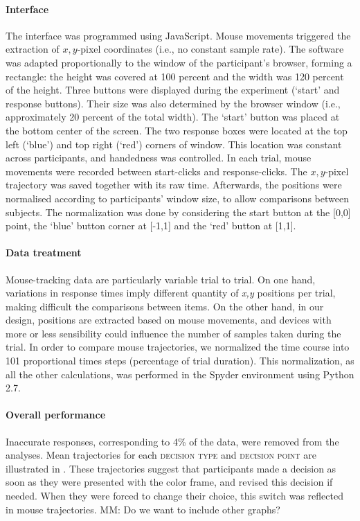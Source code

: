 \documentclass{article}
\newcommand{\addMM}[1]{{\leavevmode\color{red}#1}}
\begin{document}
\paragraph{Interface}
The interface was programmed using JavaScript. Mouse movements triggered the extraction of $x,y$-pixel coordinates (i.e., no constant sample rate). The software was adapted proportionally to the window of the participant's browser, forming a rectangle: the height was covered at 100 percent and the width was 120 percent of the height. 
Three buttons were displayed during the experiment (`start' and response buttons). Their size was also determined by the browser window (i.e., approximately 20 percent of the total width). The `start' button was placed at the bottom center of the screen. The two response boxes were located at the top left (`blue') and top right (`red') corners of window. This location was constant across participants, and handedness was controlled.  
In each trial, mouse movements were recorded between start-clicks and response-clicks. The $x,y$-pixel trajectory was saved together with its raw time. Afterwards, the positions were normalised according to participants' window size, to allow comparisons between subjects. The normalization was done by considering the start button at the [0,0] point, the `blue' button corner at [-1,1] and the `red' button at [1,1]. 

\paragraph{Data treatment}
Mouse-tracking data are particularly variable trial to trial. On one hand, variations in response times imply different quantity of \textit{x,y} positions per trial, making difficult the comparisons between items. On the other hand, in our design, positions are extracted based on mouse movements, and devices with more or less sensibility could influence the number of samples taken during the trial. In order to compare mouse trajectories, we normalized the time course into 101 proportional times steps (percentage of trial duration). This normalization, as all the other calculations, was performed in the Spyder environment using Python 2.7. 

\paragraph{Overall performance}
Inaccurate responses, corresponding to 4\% of the data, were removed from the analyses. 
Mean trajectories for each \textsc{decision type} and \textsc{decision point} are illustrated in . 
These trajectories suggest that participants made a decision as soon as they were presented with the color frame, and revised this decision if needed. When they were forced to change their choice, this switch was reflected in mouse trajectories. 
\addMM{MM: Do we want to include other graphs?}
\end{document}

